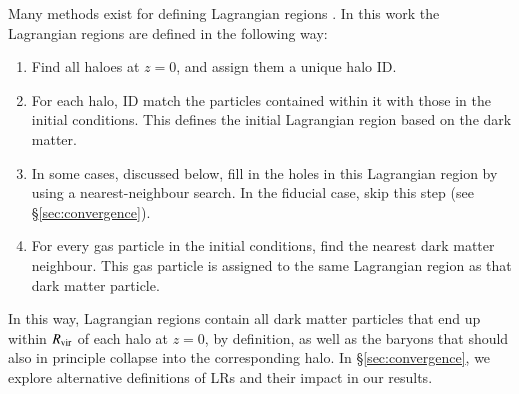 Many methods exist for defining Lagrangian regions \citep[see e.g. ][ for a
collection of methods]{Onorbe2014}. In this work the Lagrangian regions are
defined in the following way:
\begin{enumerate}
	\item Find all haloes at $z=0$, and assign them a unique halo ID.

    \item For each halo, ID match the particles contained within it with those
		  in the initial conditions. This defines the initial Lagrangian region
		  based on the dark matter.

	\item In some cases, discussed below, fill in the holes in this Lagrangian
		  region by using a nearest-neighbour search. In the fiducial case, skip
		  this step (see \S \ref{sec:convergence}).

	\item For every gas particle in the initial conditions, find the nearest dark
	      matter neighbour. This gas particle is assigned to the same Lagrangian
	      region as that dark matter particle.
\end{enumerate}
In this way, Lagrangian regions contain all dark matter particles that end up
within $R_{\rm vir}$ of each halo at $z=0$, by definition, as well as the
baryons that should also in principle collapse into the corresponding halo.
In \S \ref{sec:convergence}, we explore alternative definitions of LRs and
their impact in our results.